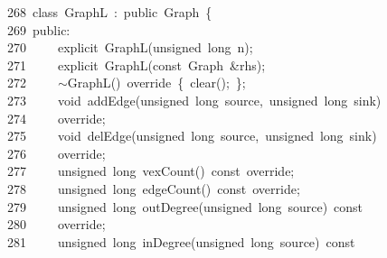 \documentclass{ctexart}
\newcommand{\hlstd}[1]{\textcolor[rgb]{0.2,0.2,0.2}{#1}}
\newcommand{\hlopt}[1]{\textcolor[rgb]{0.2,0.2,0.2}{#1}}
\newcommand{\hllin}[1]{\textcolor[rgb]{0.59,0.59,0.59}{#1}}
\newcommand{\hlkwb}[1]{\textcolor[rgb]{0.63,0,0.31}{#1}}
\newcommand{\hlkwc}[1]{\textcolor[rgb]{0,0.63,0.31}{#1}}
\newcommand{\hlkwd}[1]{\textcolor[rgb]{0.78,0.23,0.41}{#1}}
\begin{document}
\hllin{268\ }\hlstd{}\hlkwc{class\ }\hlstd{GraphL\ }\hlopt{:\ }\hlstd{}\hlkwc{public\ }\hlstd{Graph\ }\hlopt{\{}\\
\hllin{269\ }\hlstd{}\hlkwc{public}\hlstd{}\hlopt{:}\\
\hllin{270\ }\hlstd{}\hlstd{\ \ \ \ }\hlstd{}\hlkwc{explicit\ }\hlstd{}\hlkwd{GraphL}\hlstd{}\hlopt{(}\hlstd{}\hlkwb{unsigned\ long\ }\hlstd{n}\hlopt{);}\\
\hllin{271\ }\hlstd{}\hlstd{\ \ \ \ }\hlstd{}\hlkwc{explicit\ }\hlstd{}\hlkwd{GraphL}\hlstd{}\hlopt{(}\hlstd{}\hlkwb{const\ }\hlstd{Graph\ }\hlopt{\&}\hlstd{rhs}\hlopt{);}\\
\hllin{272\ }\hlstd{}\hlstd{\ \ \ \ }\hlstd{}\hlopt{$\sim$}\hlstd{}\hlkwd{GraphL}\hlstd{}\hlopt{()\ }\hlstd{override\ }\hlopt{\{\ }\hlstd{}\hlkwd{clear}\hlstd{}\hlopt{();\ \};}\\
\hllin{273\ }\hlstd{}\hlstd{\ \ \ \ }\hlstd{}\hlkwb{void\ }\hlstd{}\hlkwd{addEdge}\hlstd{}\hlopt{(}\hlstd{}\hlkwb{unsigned\ long\ }\hlstd{source}\hlopt{,\ }\hlstd{}\hlkwb{unsigned\ long\ }\hlstd{sink}\hlopt{)\ }\Righttorque\\
\hllin{274\ }\hlstd{}\hlstd{\ \ \ \ }\hlstd{override}\hlopt{;}\\
\hllin{275\ }\hlstd{}\hlstd{\ \ \ \ }\hlstd{}\hlkwb{void\ }\hlstd{}\hlkwd{delEdge}\hlstd{}\hlopt{(}\hlstd{}\hlkwb{unsigned\ long\ }\hlstd{source}\hlopt{,\ }\hlstd{}\hlkwb{unsigned\ long\ }\hlstd{sink}\hlopt{)\ }\Righttorque\\
\hllin{276\ }\hlstd{}\hlstd{\ \ \ \ }\hlstd{override}\hlopt{;}\\
\hllin{277\ }\hlstd{}\hlstd{\ \ \ \ }\hlstd{}\hlkwb{unsigned\ long\ }\hlstd{}\hlkwd{vexCount}\hlstd{}\hlopt{()\ }\hlstd{}\hlkwb{const\ }\hlstd{override}\hlopt{;}\\
\hllin{278\ }\hlstd{}\hlstd{\ \ \ \ }\hlstd{}\hlkwb{unsigned\ long\ }\hlstd{}\hlkwd{edgeCount}\hlstd{}\hlopt{()\ }\hlstd{}\hlkwb{const\ }\hlstd{override}\hlopt{;}\\
\hllin{279\ }\hlstd{}\hlstd{\ \ \ \ }\hlstd{}\hlkwb{unsigned\ long\ }\hlstd{}\hlkwd{outDegree}\hlstd{}\hlopt{(}\hlstd{}\hlkwb{unsigned\ long\ }\hlstd{source}\hlopt{)\ }\hlstd{}\hlkwb{const\ }\Righttorque\\
\hllin{280\ }\hlstd{}\hlstd{\ \ \ \ }\hlstd{override}\hlopt{;}\\
\hllin{281\ }\hlstd{}\hlstd{\ \ \ \ }\hlstd{}\hlkwb{unsigned\ long\ }\hlstd{}\hlkwd{inDegree}\hlstd{}\hlopt{(}\hlstd{}\hlkwb{unsigned\ long\ }\hlstd{source}\hlopt{)\ }\hlstd{}\hlkwb{const\ }\Righttorque\\
\end{document}
